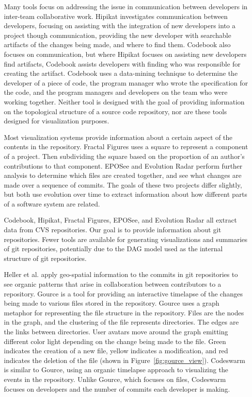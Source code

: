 Many tools focus on addressing the issue in communication between
developers in inter-team collaborative work. Hipikat\cite{Cubranic2005}
investigates communication between developers, focusing on assisting
with the integration of new developers into a project though
communication, providing the new developer with searchable artifacts of
the changes being made, and where to find them. Codebook\cite{Begel2010}
also focuses on communication, but where Hipikat focuses on assisting
new developers find artifacts, Codebook assists developers with finding
who was responsible for creating the artifact. Codebook uses a
data-mining technique to determine the developer of a piece of code, the
program manager who wrote the specification for the code, and the
program managers and developers on the team who were working together.
Neither tool is designed with the goal of providing information on the
topological structure of a source code repository, nor are these tools
designed for visualization purposes.

Most visualization systems provide information about a certain aspect of
the contents in the repository. Fractal Figures\cite{Ambros2005} uses a
square to represent a component of a project. Then subdividing the
square based on the proportion of an author's contributions to that
component. EPOSee\cite{Burch2005} and Evolution Radar\cite{Ambros2009}
perform further analysis to determine which files are created together,
and see what changes are made over a sequence of commits. The goals of
these two projects differ slightly, but both use evolution over time to
extract information about how different parts of a software system are
related.

Codebook, Hipikat, Fractal Figures, EPOSee, and Evolution Radar all
extract data from CVS repositories. Our goal is to provide information
about git repositories. Fewer tools are available for generating
visualizations and summaries of git repositories, potentially due to the
DAG model used as the internal structure of git repositories.

Heller et al.\cite{Heller2011} apply geo-spatial information to the
commits in git repositories to see organic patterns that arise in
collaboration between contributors to a repository.
Gource\cite{Caudwell2010} is a tool for providing an interactive
timelapse of the changes being made to various files stored in the
repository. Gource uses a graph metaphor for representing the file
structure in the repository. Files are the nodes in the graph, and the
clustering of the file represents directories. The edges are the links
between directories. User avatars move around the graph emitting
different color light depending on the change being made to the file.
Green indicates the creation of a new file, yellow indicates a
modification, and red indicates the deletion of the file (shown in
Figure~\ref{fig:gource_view}). Codeswarm\cite{ogawa09} is similar to
Gource, using an organic timelapse approach to visualizing the events in
the repository. Unlike Gource, which focuses on files, Codeswarm focuses
on developers and the number of commits each developer is making.

